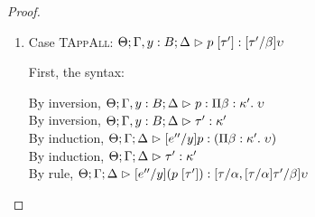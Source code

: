 \begin{proof}
\begin{enumerate}
  For semantics, consider $\interp{\judgeA[\Theta; \Gamma; \Delta]{[e''/y](p\;q)}{\upsilon}}\;\theta\;\gamma\;\delta$
  \begin{eqnproof}
    {Semantics}
    {Induction}
          {Semantics}
  \end{eqnproof}


\item Case \textsc{TAppAll}: $\judgeA[\Theta; \Gamma, y:B; \Delta]{p\;[\tau']}{[\tau'/\beta]\upsilon}$
  
  First, the syntax:
  \begin{tabbedproof}
    \oo By inversion, $\judgeA[\Theta; \Gamma, y:B; \Delta]{p}{\forallsort{\beta}{\kappa'}{\upsilon}}$\\
    \oo By inversion, $\judgeA[\Theta; \Gamma, y:B; \Delta]{\tau'}{\kappa'}$\\
    \oo By induction, $\judgeA[\Theta; \Gamma; \Delta]{[e''/y]p}{(\forallsort{\beta}{\kappa'}{\upsilon})}$\\
    \oo By induction, $\judgeA[\Theta; \Gamma; \Delta]{\tau'}{\kappa'}$\\
    \oo By rule, $\judgeA[\Theta; \Gamma; \Delta]{[e''/y](p\;[\tau'])}{{[\tau/\alpha, [\tau/\alpha]\tau'/\beta]}\upsilon}$\\
  \end{tabbedproof}


\end{enumerate}
\end{proof}
